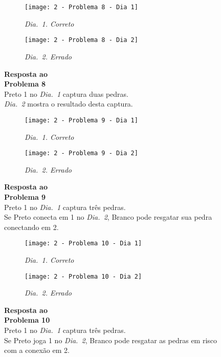 \begin{SCfigure}[][h!]
    \begin{subfigure}[t]{.31\textwidth}
        \texttt{[image: 2 - Problema 8 - Dia 1]}
        \caption*{\emph{Dia.\@~1. Correto}}
    \end{subfigure}
    \hfill
    \begin{subfigure}[t]{.31\textwidth}
        \texttt{[image: 2 - Problema 8 - Dia 2]}
        \caption*{\emph{Dia.\@~2. Errado}}
    \end{subfigure}
    \hfill
    \caption*{\textbf{Resposta ao\\Problema 8}\\\vspace*{.25cm}Preto 1 no \emph{Dia.\@~1} captura duas pedras.\\\vspace*{.25cm}\emph{Dia.\@~2} mostra o resultado desta captura.}
\end{SCfigure}

\vfill

\begin{SCfigure}[][h!]
    \begin{subfigure}[t]{.31\textwidth}
        \texttt{[image: 2 - Problema 9 - Dia 1]}
        \caption*{\emph{Dia.\@~1. Correto}}
    \end{subfigure}
    \hfill
    \begin{subfigure}[t]{.31\textwidth}
        \texttt{[image: 2 - Problema 9 - Dia 2]}
        \caption*{\emph{Dia.\@~2. Errado}}
    \end{subfigure}
    \hfill
    \caption*{\textbf{Resposta ao\\Problema 9}\\\vspace*{.25cm}Preto 1 no \emph{Dia.\@~1} captura três pedras.\\\vspace*{.25cm}
    Se Preto conecta em 1 no \emph{Dia.\@~2}, Branco pode resgatar sua pedra conectando em 2.}
\end{SCfigure}

\pagebreak

\begin{SCfigure}[][h!]
    \begin{subfigure}[t]{.31\textwidth}
        \texttt{[image: 2 - Problema 10 - Dia 1]}
        \caption*{\emph{Dia.\@~1. Correto}}
    \end{subfigure}
    \hfill
    \begin{subfigure}[t]{.31\textwidth}
        \texttt{[image: 2 - Problema 10 - Dia 2]}
        \caption*{\emph{Dia.\@~2. Errado}}
    \end{subfigure}
    \hfill
    \caption*{\textbf{Resposta ao\\Problema 10}\\\vspace*{.25cm}Preto 1 no \emph{Dia.\@~1} captura três pedras.\\\vspace*{.25cm}Se Preto joga 1 no \emph{Dia.\@~2}, Branco pode resgatar as pedras em risco com a conexão em 2.}
\end{SCfigure}

